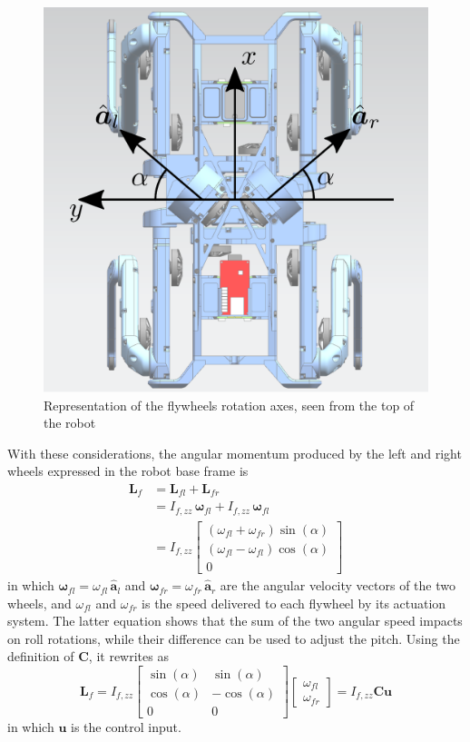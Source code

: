\documentclass[journal,letterpaper]{IEEEtran}
\begin{document}
\begin{figure}
	\centering
	\includegraphics[width=0.7\linewidth]{figures/angular_velocities.eps}
	\caption{Representation of the flywheels rotation axes, seen from the top of the robot}
	\label{fig:angVel}
\end{figure}
\noindent With these considerations, the angular momentum produced by the left and right wheels expressed in the robot base frame is
\begin{equation}
\begin{split}
\bm{L}_f &= \bm{L}_{fl} + \bm{L}_{fr} \\
&=I_{f, zz} \, \bm{\omega}_{fl} + I_{f, zz} \, \bm{\omega}_{fl}\\
&=I_{f, zz}
\left[\begin{array}{c}
 \left(\omega_{fl} +  \omega_{fr}\right)\sin(\alpha) \\ 
 \left(\omega_{fl} -  \omega_{fl}\right)\cos(\alpha) \\
 0
\end{array}\right]
\end{split}
\end{equation}
in which $\bm{\omega}_{fl}= \omega_{fl} \, \hat{\bm{a}}_{l}$ and $\bm{\omega}_{fr}= \omega_{fr} \, \hat{\bm{a}}_{r}$ are the angular velocity vectors of the two wheels, and $\omega_{fl}$ and $\omega_{fr}$ is the speed delivered to each flywheel by its actuation system. The latter equation shows that the sum of the two angular speed impacts on roll rotations, while their difference can be used to adjust the pitch. Using the definition of $\bm{C}$, it rewrites as
\begin{equation}
\bm{L}_f = I_{f,zz}
\left[
\begin{array}{cc}
\sin(\alpha) & \sin(\alpha) \\
\cos(\alpha) & -\cos(\alpha) \\
0 & 0
\end{array}
\right]
\left[
\begin{array}{cc}
\omega_{fl} \\
\omega_{fr}
\end{array}
\right] = I_{f,zz} \bm{C} \bm{u}
\end{equation}
in which $\bm{u}$ is the control input.
\end{document}
